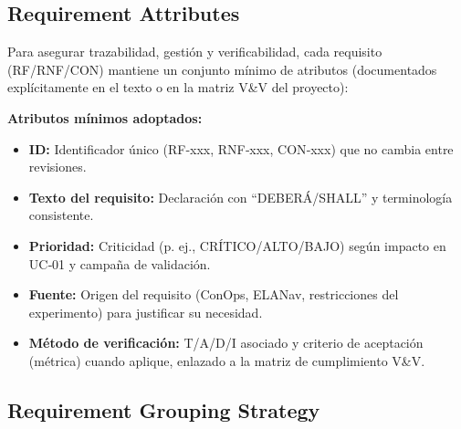 \subsection{Requirement Attributes}

Para asegurar trazabilidad, gestión y verificabilidad, cada requisito (RF/RNF/CON) mantiene un conjunto mínimo de atributos (documentados explícitamente en el texto o en la matriz V\&V del proyecto):

\textbf{Atributos mínimos adoptados:}
\begin{itemize}
    \item \textbf{ID:} Identificador único (RF‑xxx, RNF‑xxx, CON‑xxx) que no cambia entre revisiones.
    \item \textbf{Texto del requisito:} Declaración con ``DEBERÁ/SHALL'' y terminología consistente.
    \item \textbf{Prioridad:} Criticidad (p. ej., CRÍTICO/ALTO/BAJO) según impacto en UC‑01 y campaña de validación.
    \item \textbf{Fuente:} Origen del requisito (ConOps, ELANav, restricciones del experimento) para justificar su necesidad.
    \item \textbf{Método de verificación:} T/A/D/I asociado y criterio de aceptación (métrica) cuando aplique, enlazado a la matriz de cumplimiento V\&V.
\end{itemize}

\subsection{Requirement Grouping Strategy}

